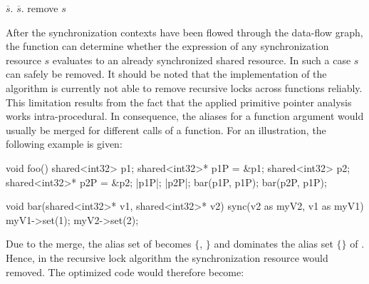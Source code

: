 \begin{algorithmic}
\State {}
 
      \State $\overline{s}.$ 
    \EndIf
  \EndFor
\EndFor
\Repeat {}
     
      \State $\overline{s}.$
    \EndIf
  \EndFor
{}
 
      \State remove $s$
  \EndIf
\EndFor
\EndFunction
\end{algorithmic}
After the synchronization contexts have been flowed through the data-flow graph, the function can determine whether the expression of any synchronization resource $s$ evaluates to an already synchronized shared resource. In such a case $s$ can safely be removed. It should be noted that the implementation of the algorithm is currently not able to remove recursive locks across functions reliably. This limitation results from the fact that the applied primitive pointer analysis works intra-procedural. In consequence, the aliases for a function argument would usually be merged for different calls of a function. For an illustration, the following example is given:
\begin{ccode}
void foo() {
  shared<int32> p1; 
  shared<int32>* p1P = &p1; 
  shared<int32> p2; 
  shared<int32>* p2P = &p2;
  |p1P|; 
  |p2P|;
  bar(p1P, p1P);
  bar(p2P, p1P);
}

void bar(shared<int32>* v1, shared<int32>* v2) { 
  sync(v2 as myV2, v1 as myV1) { 
    myV1->set(1); 
    myV2->set(2); 
  } 
}
\end{ccode}
Due to the merge, the alias set of  becomes $\{$, $\}$ and dominates the alias set $\{$$\}$ of . Hence, in the recursive lock algorithm the synchronization resource  would removed. The optimized code would therefore become:
